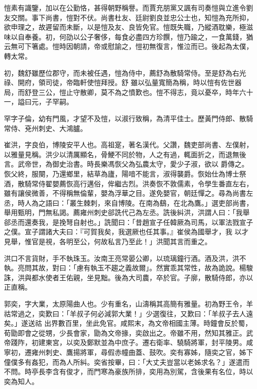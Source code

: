 \begin{pinyinscope}
 愷素有識鑒，加以在公勤恪，甚得朝野稱譽。而賈充朋黨又諷有司奏愷與立進令劉友交關。事下尚書，愷對不伏。尚書杜友、廷尉劉良並忠公士也，知愷為充所抑，欲申理之，故遲留而未斷，以是愷及友、良皆免官。愷既失職，乃縱酒耽樂，極滋味以自奉養。初，何劭以公子奢侈，每食必盡四方珍饌，愷乃踰之，一食萬錢，猶云無可下箸處。愷時因朝請，帝或慰諭之，愷初無復言，惟泣而已。後起為太僕，轉太常。



 初，魏舒雖歷位郡守，而未被任遇，愷為侍中，薦舒為散騎常侍。至是舒為右光祿、開府，領司徒，帝臨軒使愷拜授。舒
 雖以弘量寬簡為稱，時以愷有佐世器局，而舒登三公，愷止守散卿，莫不為之憤歎也。愷不得志，竟以憂卒，時年六十一，謚曰元，子罕嗣。



 罕字子倫，幼有門風，才望不及愷，以淑行致稱，為清平佳士。歷黃門侍郎、散騎常侍、兗州刺史、大鴻臚。



 崔洪，字良伯，博陵安平人也。高祖寔，著名漢代。父讚，魏吏部尚書、左僕射，以雅量見稱。洪少以清厲顯名，骨鯁不同於物，人之有過，輒面折之，而退無後言。武帝世，為御史治書。時長樂馮恢父為弘農太守，愛少子淑，欲以
 爵傳之。恢父終，服闋，乃還鄉里，結草為廬，陽喑不能言，淑得襲爵。恢始仕為博士祭酒，散騎常侍翟嬰薦恢高行邁俗，侔繼古烈。洪奏恢不敦儒素，令學生番直左右，雖有讓侯微善，不得稱無倫輩，嬰為浮華之目。遂免嬰官，朝廷憚之。尋為尚書左丞，時人為之語曰：「叢生棘刺，來自博陵。在南為鷂，在北為鷹。」選吏部尚書，舉用甄明，門無私謁。薦雍州刺史郤詵代己為左丞。詵後糾洪，洪謂人曰：「我舉郤丞而還奏我，是挽弩自射也。」詵聞曰：「昔趙宣子任韓厥為司馬，以軍法戮宣子之僕。宣子謂諸大夫曰：『可賀我矣，我選厥也任其事。』崔侯為國舉才，我
 以才見舉，惟官是視，各明至公，何故私言乃至此！」洪聞其言而重之。



 洪口不言貨財，手不執珠玉。汝南王亮常晏公卿，以琉璃鐘行酒。酒及洪，洪不執。亮問其故，對曰：「慮有執玉不趨之義故爾」。然實乖其常性，故為詭說。楊駿誅，洪與都水使者王佑親，坐見黜。後為大司農，卒於官。子廓，散騎侍郎，亦以正直稱。



 郭奕，字大業，太原陽曲人也。少有重名，山濤稱其高簡有雅量。初為野王令，羊祜常過之，奕歎曰：「羊叔子何必減郭大業！」少選復往，又歎曰：「羊叔子去人遠矣。」遂送祜
 出界數百里，坐此免官。咸熙末，為文帝相國主薄。時鐘會反於蜀，荀勖即會之從甥，少長會家，勖為文帝掾，奕啟出之。帝雖不用，然知其雅正。武帝踐阼，初建東宮，以奕及鄭默並為中庶子。遷右衛率、驍騎將軍，封平陵男。咸寧初，遷雍州刺史、鷹揚將軍，尋假赤幢曲蓋、鼓吹。奕有寡姊，隨奕之官，姊下僮僕多有姦犯，而為人所糾。奕省按畢，曰：「大丈夫豈當以老姊求名？」遂遣而不問。時亭長李含有俊才，而門寒為豪族所排，奕用為別駕，含後果有名位，時以奕為知人。




\end{pinyinscope}
